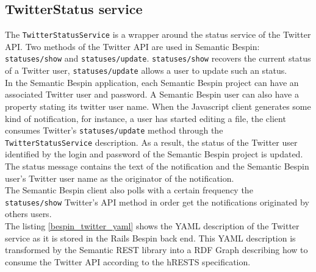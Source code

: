 \subsection{TwitterStatus service}
The \texttt{TwitterStatusService}  is a wrapper around the status service of the Twitter API. Two methods of the Twitter API are
used in Semantic Bespin: \texttt{statuses/show} and \texttt{statuses/update}. \texttt{statuses/show} recovers the
current status of a Twitter user, \texttt{statuses/update} allows a user to update such an status.\\
In the Semantic Bespin application, each Semantic Bespin project can have an associated Twitter user and password. A
Semantic Bespin user can also have a property stating its twitter user name. When the Javascript client generates some
kind of notification, for instance, a user has started editing a file, the client consumes Twitter's
\texttt{statuses/update} method through the \texttt{TwitterStatusService} description. As a result, the status of the
Twitter user identified by the login and password of the Semantic Bespin project is updated. The status message contains
the text of the notification and the Semantic Bespin user's Twitter user name as the originator of the notification.\\

The Semantic Bespin client also polls with a certain frequency the \texttt{statuses/show} Twitter's API method in order
get the notifications originated by others users.\\

The listing \ref{bespin_twitter_yaml} shows the YAML description of the Twitter service as it is stored in the Rails
Bespin back end. This YAML description is transformed by the Semantic REST library into a RDF Graph describing how to
consume the Twitter API according to the hRESTS specification.\\


